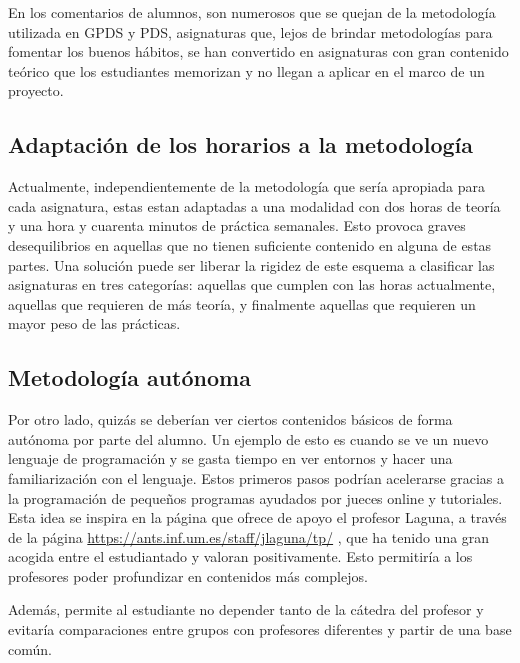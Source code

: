 En los comentarios de alumnos, son numerosos que se quejan de 
la metodología utilizada en GPDS y PDS, asignaturas que, lejos
de brindar metodologías para fomentar los buenos hábitos, se han 
convertido en asignaturas con gran contenido teórico que los
estudiantes memorizan y no llegan a aplicar en el marco de un
proyecto.


\subsection{Adaptación de los horarios a la metodología}

Actualmente, independientemente de la metodología que sería apropiada para 
cada asignatura, estas estan adaptadas a una modalidad con dos horas de
teoría y una hora y cuarenta minutos de práctica semanales. Esto provoca
graves desequilibrios en aquellas que no tienen suficiente contenido en
alguna de estas partes. Una solución puede ser liberar la rigidez de este 
esquema a clasificar las asignaturas en tres categorías: aquellas que 
cumplen con las horas actualmente, aquellas que requieren de más teoría,
y finalmente aquellas que requieren un mayor peso de las prácticas. 

\subsection{Metodología autónoma}

Por otro lado, quizás se deberían ver ciertos contenidos básicos de forma
autónoma por parte del alumno. Un ejemplo de esto es cuando se ve un nuevo
lenguaje de programación y se gasta tiempo en ver entornos y hacer una 
familiarización con el lenguaje. Estos primeros pasos podrían acelerarse
gracias a la programación de pequeños programas ayudados por jueces online y
tutoriales. Esta idea se inspira en la página que ofrece de apoyo el profesor 
Laguna, a través de la página \url{https://ants.inf.um.es/staff/jlaguna/tp/}
, que ha tenido una gran acogida entre el estudiantado y valoran positivamente.
Esto permitiría a los profesores poder profundizar en contenidos más complejos.

Además, permite al estudiante no depender tanto de la cátedra del profesor y 
evitaría comparaciones entre grupos con profesores diferentes y partir de 
una base común.

